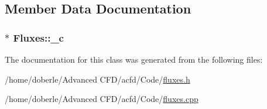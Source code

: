 \subsection{Member Data Documentation}
\subsubsection[{\texorpdfstring{\+\_\+c}{_c}}]{$\ast$ Fluxes\+::\+\_\+c\hspace{0.3cm}{\ttfamily [protected]}}\hypertarget{class_fluxes_a82e80aa9b4d9431508850c1fe1d91c56}{}\label{class_fluxes_a82e80aa9b4d9431508850c1fe1d91c56}


The documentation for this class was generated from the following files\+:\begin{DoxyCompactItemize}
\item 
/home/doberle/\+Advanced C\+F\+D/acfd/\+Code/\hyperlink{fluxes_8h}{fluxes.\+h}\item 
/home/doberle/\+Advanced C\+F\+D/acfd/\+Code/\hyperlink{fluxes_8cpp}{fluxes.\+cpp}\end{DoxyCompactItemize}
